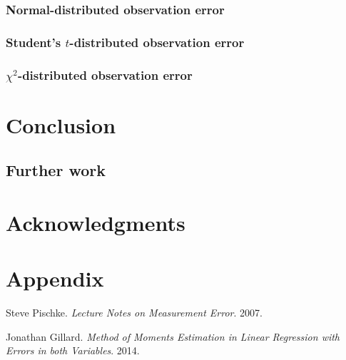 \documentclass{article}
\begin{document}
\subsubsection{Normal-distributed observation error}

\subsubsection{Student's $t$-distributed observation error}

\subsubsection{$\chi^2$-distributed observation error}

\section{Conclusion}

\subsection{Further work}

\section{Acknowledgments}

\section{Appendix}

\begin{thebibliography}{9}

    Steve Pischke.
    \textit{Lecture Notes on Measurement Error}.
    2007.

    Jonathan Gillard.
    \textit{Method of Moments Estimation in Linear Regression with Errors in both Variables}.
    2014.

\end{thebibliography}
\end{document}
